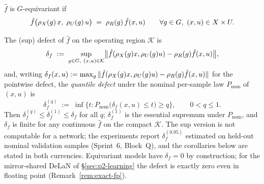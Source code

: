 \begin{definition}
\label{def:equiv-model}
$\hat f$ is $G$-equivariant if
\begin{equation}
  \label{eq:equiv-model}
  \hat f\bigl(\rho_{X}(g)\,x,\; \rho_{U}(g)\,u\bigr) \;=\; \rho_{R}(g)\, \hat f(x,u)
  \qquad \forall g \in G,\ (x,u) \in X \times U .
\end{equation}
\end{definition}

\begin{definition}
\label{def:defect}
The (sup) defect of $\hat f$ on the operating region $\mathcal{K}$ is
\begin{equation}
  \label{eq:defect}
  \delta_f \;:=\; \sup_{g \in G,\ (x,u) \in \mathcal{K}}
  \bigl\| \hat f(\rho_{X}(g)x, \rho_{U}(g)u) - \rho_{R}(g)\hat f(x,u) \bigr\| ,
\end{equation}
and, writing $\delta_f(x,u) := \max_g \|\hat f(\rho_{X}(g)x,\rho_{U}(g)u) -
\rho_{R}(g)\hat f(x,u)\|$ for the pointwise defect, the \emph{quantile defect}
under the nominal per-sample law $P_{\mathrm{nom}}$ of $(x,u)$ is
\begin{equation}
  \label{eq:defect-q}
  \delta_f^{(q)} \;:=\; \inf\bigl\{ t : P_{\mathrm{nom}}\bigl(\delta_f(x,u) \le t\bigr) \ge q \bigr\},
  \qquad 0 < q \le 1 .
\end{equation}
Then $\delta_f^{(q)} \le \delta_f^{(1)} \le \delta_f$ for all $q$;
$\delta_f^{(1)}$ is the essential supremum under $P_{\mathrm{nom}}$, and
$\delta_f$ is finite for any continuous $\hat f$ on the compact
$\mathcal{K}$. The sup version is not computable for a network; the
experiments report $\delta_f^{(0.95)}$ estimated on held-out nominal
validation samples (Sprint~6, Block~Q), and the corollaries below are stated
in both currencies. Equivariant models have $\delta_f = 0$ by
construction; for the mirror-shared DeLaN of \S\ref{sec:p2-learning} the
defect is exactly zero even in floating point (Remark~\ref{rem:exact-fp}).
\end{definition}

